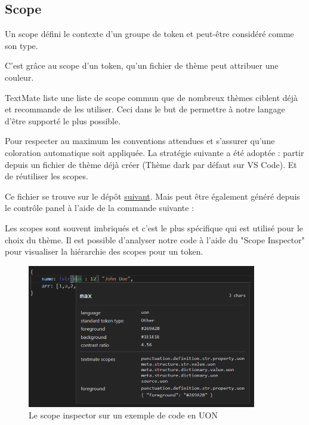 \documentclass[
    iict, %
    il, %
]{heig-tb}
\begin{document}
\subsection{Scope}
Un scope défini le contexte d'un groupe de token et peut-être considéré comme son type.

C'est grâce au scope d'un token, qu'un fichier de thème peut attribuer une couleur.

TextMate liste une liste de scope commun que de nombreux thèmes ciblent déjà et recommande de les utiliser.
Ceci dans le but de permettre à notre langage d'être supporté le plus possible.

Pour respecter au maximum les conventions attendues et s'assurer qu'une coloration automatique soit appliquée. La stratégie suivante a été adoptée : partir depuis un fichier de thème déjà créer (Thème dark par défaut sur VS Code). Et de réutiliser les scopes.

Ce fichier se trouve sur le dépôt \href{https://github.com/microsoft/vscode/blob/main/extensions/theme-defaults/themes/dark_vs.json}{suivant}.
Mais peut être également généré depuis le contrôle panel à l'aide de la commande suivante : %


Les scopes sont souvent imbriqués et c'est le plus spécifique qui est utilisé pour le choix du thème.
Il est possible d'analyser notre code à l'aide du "Scope Inspector" pour visualiser la hiérarchie des scopes pour un token.

\begin{figure}[!h]
    \begin{center}
        \includegraphics[width=10cm]{assets/figures/scope-inspector.png}
    \end{center}
    \caption[Scope inspector]{\label{basic-uon} Le scope inspector sur un exemple de code en UON}
\end{figure}
\end{document}
